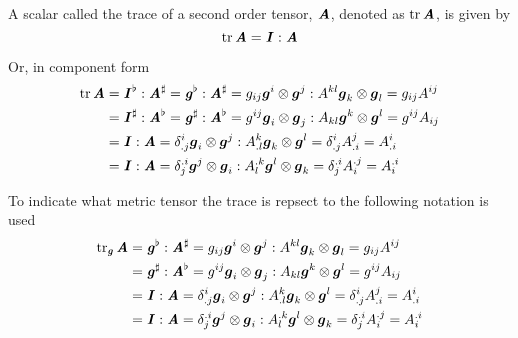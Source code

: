 A scalar called the trace of a second order tensor, $\boldsymbol{\mathit{A}}$, denoted as
$\trace{}{\tensor{A}}$, is given by 
\begin{equation}
  \trace{}{\tensortwo{A}}=\doubledotprod{\tensortwo{I}}{\tensortwo{A}}
\end{equation}

Or, in component form
\begin{equation}
  \begin{aligned}
    \trace{}{\tensortwo{A}}&=\doubledotprod{\flattensor{\tensortwo{I}}}{\sharptensor{\tensortwo{A}}}=\doubledotprod{\flattensor{\tensortwo{g}}}{\sharptensor{\tensortwo{A}}}=\doubledotprod{g_{ij}\tensorprod{\vectr{g}^{i}}{\vectr{g}^{j}}}{A^{kl}\tensorprod{\vectr{g}_{k}}{\vectr{g}_{l}}}=g_{ij}A^{ij}\\
    &=\doubledotprod{\sharptensor{\tensortwo{I}}}{\flattensor{\tensortwo{A}}}=\doubledotprod{\sharptensor{\tensortwo{g}}}{\flattensor{\tensortwo{A}}}=\doubledotprod{g^{ij}\tensorprod{\vectr{g}_{i}}{\vectr{g}_{j}}}{A_{kl}\tensorprod{\vectr{g}^{k}}{\vectr{g}^{l}}}=g^{ij}A_{ij}\\
    &=\doubledotprod{\tensortwo{I}}{\tensortwo{A}}=\doubledotprod{\mixedkronecker{i}{.j}\tensorprod{\vectr{g}_{i}}{\vectr{g}^{j}}}{A^{k}_{.l}\tensorprod{\vectr{g}_{k}}{\vectr{g}^{l}}}=\mixedkronecker{i}{.j}A^{j}_{.i}=A^{i}_{.i} \\
    &=\doubledotprod{\tensortwo{I}}{\tensortwo{A}}=\doubledotprod{\mixedkronecker{.i}{j}\tensorprod{\vectr{g}^{j}}{\vectr{g}_{i}}}{A^{.k}_{l}\tensorprod{\vectr{g}^{l}}{\vectr{g}_{k}}}=\mixedkronecker{.i}{j}A^{.j}_{i}=A^{.i}_{i}
  \end{aligned}
\end{equation}

To indicate what metric tensor the trace is repsect to the following notation
is used
\begin{equation}
  \begin{aligned}
    \trace{\tensortwo{g}}{\tensortwo{A}}&=\doubledotprod{\flattensor{\tensortwo{g}}}{\sharptensor{\tensortwo{A}}}=\doubledotprod{g_{ij}\tensorprod{\vectr{g}^{i}}{\vectr{g}^{j}}}{A^{kl}\tensorprod{\vectr{g}_{k}}{\vectr{g}_{l}}}=g_{ij}A^{ij}\\
    &=\doubledotprod{\sharptensor{\tensortwo{g}}}{\flattensor{\tensortwo{A}}}=\doubledotprod{g^{ij}\tensorprod{\vectr{g}_{i}}{\vectr{g}_{j}}}{A_{kl}\tensorprod{\vectr{g}^{k}}{\vectr{g}^{l}}}=g^{ij}A_{ij}\\
    &=\doubledotprod{\tensortwo{I}}{\tensortwo{A}}=\doubledotprod{\mixedkronecker{i}{.j}\tensorprod{\vectr{g}_{i}}{\vectr{g}^{j}}}{A^{k}_{.l}\tensorprod{\vectr{g}_{k}}{\vectr{g}^{l}}}=\mixedkronecker{i}{.j}A^{j}_{.i}=A^{i}_{.i} \\
    &=\doubledotprod{\tensortwo{I}}{\tensortwo{A}}=\doubledotprod{\mixedkronecker{.i}{j}\tensorprod{\vectr{g}^{j}}{\vectr{g}_{i}}}{A^{.k}_{l}\tensorprod{\vectr{g}^{l}}{\vectr{g}_{k}}}=\mixedkronecker{.i}{j}A^{.j}_{i}=A^{.i}_{i}
  \end{aligned}
\end{equation}

